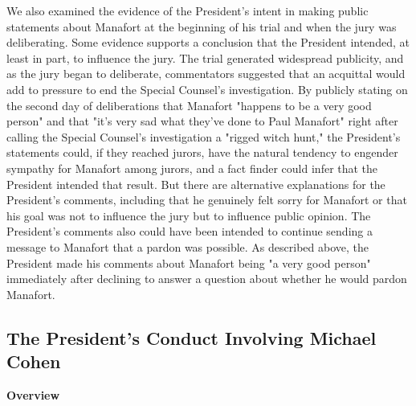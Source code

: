 {We also examined the evidence of the President's intent in making public statements about Manafort at the beginning of his trial and when the jury was deliberating.
Some evidence supports a conclusion that the President intended, at least in part, to influence the jury.
The trial generated widespread publicity, and as the jury began to deliberate, commentators suggested that an acquittal would add to pressure to end the Special Counsel's investigation.
By publicly stating on the second day of deliberations that Manafort "happens to be a very good person" and that "it's very sad what they've done to Paul Manafort" right after calling the Special Counsel's investigation a "rigged witch hunt," the President's statements could, if they reached jurors, have the natural tendency to engender sympathy for Manafort among jurors, and a fact finder could infer that the President intended that result.
But there are alternative explanations for the President's comments, including that he genuinely felt sorry for Manafort or that his goal was not to influence the jury but to influence public opinion.
The President's comments also could have been intended to continue sending a message to Manafort that a pardon was possible.
As described above, the President made his comments about Manafort being "a very good person" immediately after declining to answer a question about whether he would pardon Manafort.


\subsection{The President's Conduct Involving Michael Cohen}

\begin{center}
\textbf{Overview}
\end{center}

}
